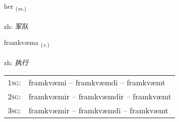 \documentclass[frontgrid, backgrid]{flacards}\usepackage[]{graphicx}\usepackage[]{color}
\begin{document}
\renewcommand{\flhead}{\vskip5pt \fboxsep=0pt {\small\bfseries\footnotesize Nafnorð | 名词}}
\renewcommand{\fcfoot}{\vskip5pt \fboxsep=0pt \hspace{2pt}{\small\bfseries\footnotesize 2K}}

\renewcommand{\blhead}{\vskip5pt {\small\bfseries\footnotesize Nafnorð | 名词 }}
\renewcommand{\bcfoot}{\vskip5pt \hspace{2pt}{\small\bfseries\footnotesize 2K}}


{her \small{\textsubscript{(\textit{m.})}} \\[1ex] %
\textphonetic{[hɛːr]} \\
zh: \emph{军队} \\  [2ex]
\renewcommand*{\arraystretch}{0.8}
}

\renewcommand{\flhead}{\vskip5pt \fboxsep=0pt {\small\bfseries\footnotesize Sagnorð | 动词}}
\renewcommand{\fcfoot}{\vskip5pt \fboxsep=0pt \hspace{2pt}{\small\bfseries\footnotesize 2K}}

\renewcommand{\blhead}{\vskip5pt {\small\bfseries\footnotesize Sagnorð | 动词 }}
\renewcommand{\bcfoot}{\vskip5pt \hspace{2pt}{\small\bfseries\footnotesize 2K}}


{framkvæma \small{\textsubscript{(\textit{v.})}} \\[1ex] %
\textphonetic{[framkʰvaima]} \\
zh: \emph{执行} \\  [2ex]
\renewcommand*{\arraystretch}{0.8}
\begin{tabular}{p{1cm}l}
\textsc{1sg}: & framkvæmi -- framkvæmdi -- framkvæmt \\ 
\textsc{2sg}: & framkvæmir -- framkvæmdir -- framkvæmt \\ 
\textsc{3sg}: & framkvæmir -- framkvæmdi -- framkvæmt \\ 
\end{tabular}
}
\end{document}

